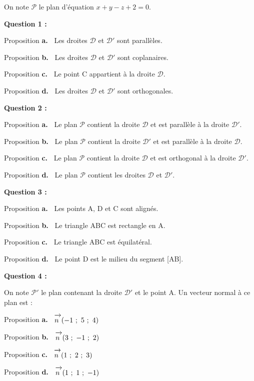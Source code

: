 \documentclass[10pt]{article}
\newcommand{\vect}[1]{\mathchoice%
{\overrightarrow{\displaystyle\mathstrut#1\,\,}}%
{\overrightarrow{\textstyle\mathstrut#1\,\,}}%
{\overrightarrow{\scriptstyle\mathstrut#1\,\,}}%
{\overrightarrow{\scriptscriptstyle\mathstrut#1\,\,}}}
\begin{document}
On note $\mathcal{P}$ le plan d'équation $x + y - z + 2 = 0$. 

\medskip

\textbf{Question 1 :}
 
Proposition \textbf{a.~} Les droites $\mathcal{D}$ et $\mathcal{D}'$ sont parallèles. 

Proposition \textbf{b.~} Les droites $\mathcal{D}$ et $\mathcal{D}'$ sont coplanaires.
 
Proposition \textbf{c.~} Le point C appartient à la droite $\mathcal{D}$.

Proposition \textbf{d.~} Les droites $\mathcal{D}$ et $\mathcal{D}'$ sont orthogonales. 

\medskip

\textbf{Question 2 :}
 
Proposition \textbf{a.~} Le plan $\mathcal{P}$ contient la droite $\mathcal{D}$ et est parallèle à la droite $\mathcal{D}'$.
 
Proposition \textbf{b.~} Le plan $\mathcal{P}$ contient la droite $\mathcal{D}'$ et est parallèle à la droite $\mathcal{D}$.
 
Proposition \textbf{c.~} Le plan $\mathcal{P}$ contient la droite $\mathcal{D}$ et est orthogonal à la droite $\mathcal{D}'$.
 
Proposition \textbf{d.~} Le plan $\mathcal{P}$ contient les droites $\mathcal{D}$ et $\mathcal{D}'$.

\medskip

\textbf{Question 3 :}
 
Proposition \textbf{a.~} Les points A, D et C sont alignés.
 
Proposition \textbf{b.~} Le triangle ABC est rectangle en A.
 
Proposition \textbf{c.~} Le triangle ABC est équilatéral.
 
Proposition \textbf{d.~} Le point D est le milieu du segment [AB]. 
 

\medskip

\textbf{Question 4 :}
 
On note $\mathcal{P}'$ le plan contenant la droite $\mathcal{D}'$ et le point A. Un vecteur normal à ce plan est :
 
Proposition \textbf{a.~} $\vect{n}(-1~;~5~;~4)$
 
Proposition \textbf{b.~} $\vect{n}(3~;~-1~;~2)$
 
Proposition \textbf{c.~} $\vect{n}(1~;~2~;~3)$
 
Proposition \textbf{d.~} $\vect{n}(1~;~1~;~-1)$
\end{document}
